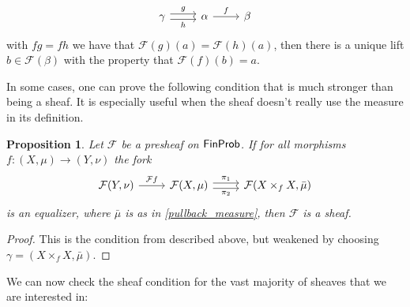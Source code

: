 \documentclass[a4paper]{amsproc}
\theoremstyle{plain}
\newtheorem{proposition}[theorem]{Proposition}
\theoremstyle{definition}
\theoremstyle{remark}
\numberwithin{equation}{section}
\newcommand{\FinProb}{\textup{\textsf{FinProb}}}
\begin{document}
\[
\begin{tikzcd}
\gamma \arrow[r, "g", shift left] \arrow[r, "h"', shift right] & \alpha \arrow[r, "f"] & \beta
\end{tikzcd}
\]
with $f g = f h$ we have that $\mathcal{F}(g)(a) = \mathcal{F}(h)(a)$, then there is a unique lift $b \in \mathcal{F}(\beta)$ with the property that $\mathcal{F}(f)(b) = a$.

In some cases, one can prove the following condition that is much stronger than being a sheaf. It is especially useful when the sheaf doesn't really use the measure in its definition.

\begin{proposition} \label{sheaf_condition_weak}
Let $\mathcal{F}$ be a presheaf on $\FinProb$. If for all morphisms $f: (X,\mu) \to (Y,\nu)$ the fork
\[
\begin{tikzcd} \mathcal{F} (Y,\nu) \arrow[r, "\mathcal{F}f"] & \mathcal{F} (X,\mu) \arrow[r, "\pi_1", shift left] \arrow[r, "\pi_2"', shift right] & \mathcal{F} (X \times_f X,\bar{\mu})
\end{tikzcd}
\]
is an equalizer, where $\bar{\mu}$ is as in \ref{pullback_measure}, then $\mathcal{F}$ is a sheaf.
\end{proposition}
\begin{proof}
This is the condition from \cite{sheaves_geometry_logic} described above, but weakened by choosing $\gamma = (X \times_f X,\bar{\mu})$.
\end{proof}

We can now check the sheaf condition for the vast majority of sheaves that we are interested in:
\end{document}
